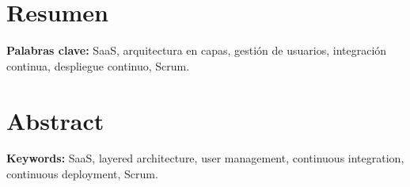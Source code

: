 \chapter*{Resumen}

\textbf{Palabras clave:} SaaS, arquitectura en capas, gestión de usuarios, integración continua, despliegue continuo, Scrum.

\chapter*{Abstract}

\textbf{Keywords:} SaaS, layered architecture, user management, continuous integration, continuous deployment, Scrum.
